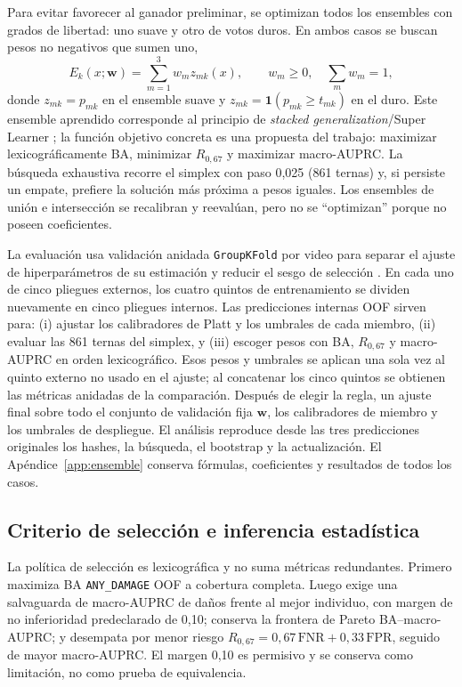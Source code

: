 Para evitar favorecer al ganador preliminar, se optimizan todos los ensembles con grados de libertad: uno suave y otro de votos duros. En ambos casos se buscan pesos no negativos que sumen uno,
\[
E_k(x;\mathbf w)=\sum_{m=1}^{3}w_m z_{mk}(x),
\qquad w_m\ge0,\quad \sum_mw_m=1,
\]
donde $z_{mk}=p_{mk}$ en el ensemble suave y $z_{mk}=\mathbf{1}(p_{mk}\ge t_{mk})$ en el duro. Este ensemble aprendido corresponde al principio de \emph{stacked generalization}/Super Learner \cite{wolpert1992stacked,vanderlaan2007superlearner}; la función objetivo concreta es una propuesta del trabajo: maximizar lexicográficamente BA, minimizar $R_{0,67}$ y maximizar macro-AUPRC. La búsqueda exhaustiva recorre el simplex con paso 0,025 (861 ternas) y, si persiste un empate, prefiere la solución más próxima a pesos iguales. Los ensembles de unión e intersección se recalibran y reevalúan, pero no se ``optimizan'' porque no poseen coeficientes.

La evaluación usa validación anidada \texttt{GroupKFold} por video para separar el ajuste de hiperparámetros de su estimación y reducir el sesgo de selección \cite{cawley2010selection,sklearn2026groupkfold}. En cada uno de cinco pliegues externos, los cuatro quintos de entrenamiento se dividen nuevamente en cinco pliegues internos. Las predicciones internas OOF sirven para: (i) ajustar los calibradores de Platt y los umbrales de cada miembro, (ii) evaluar las 861 ternas del simplex, y (iii) escoger pesos con BA, $R_{0,67}$ y macro-AUPRC en orden lexicográfico. Esos pesos y umbrales se aplican una sola vez al quinto externo no usado en el ajuste; al concatenar los cinco quintos se obtienen las métricas anidadas de la comparación. Después de elegir la regla, un ajuste final sobre todo el conjunto de validación fija $\mathbf w$, los calibradores de miembro y los umbrales de despliegue. El análisis reproduce desde las tres predicciones originales los hashes, la búsqueda, el bootstrap y la actualización. El Apéndice~\ref{app:ensemble} conserva fórmulas, coeficientes y resultados de todos los casos.

\subsection{Criterio de selección e inferencia estadística}

La política de selección es lexicográfica y no suma métricas redundantes. Primero maximiza BA \texttt{ANY\_DAMAGE} OOF a cobertura completa. Luego exige una salvaguarda de macro-AUPRC de daños frente al mejor individuo, con margen de no inferioridad predeclarado de 0,10; conserva la frontera de Pareto BA--macro-AUPRC; y desempata por menor riesgo $R_{0,67}=0,67\,\mathrm{FNR}+0,33\,\mathrm{FPR}$, seguido de mayor macro-AUPRC. El margen 0,10 es permisivo y se conserva como limitación, no como prueba de equivalencia.

